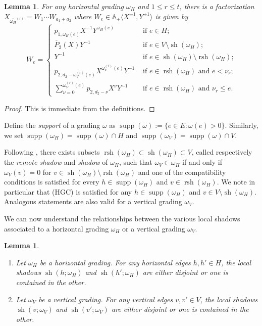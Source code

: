 \documentclass{amsart}
\newtheorem{lemma}[theorem]{Lemma}
\renewcommand{\AA}{\mathbb{A}}
\newcommand{\supp}{\operatorname{supp}}
\newcommand{\rsh}{\operatorname{rsh}}
\newcommand{\sh}{\operatorname{sh}}
\newenvironment{enumeratea}{\begin{enumerate}[\upshape (a)]}
                           {\end{enumerate}}
\begin{document}
\begin{lemma}
 For any horizontal grading $\omega_H$ and $1\le r\le t$, there is a factorization $X_{\overline{\omega_H}^{(r)}}=W_1\cdots W_{a_1+a_2}$ where $W_e\in\AA_+\langle X^{\pm1},Y^{\pm1}\rangle$ is given by
 \[W_e=\begin{cases}p_{1,\omega_H(e)}X^{-1}Y^{\omega_H(e)} & \text{ if $e\in H$;}\\ \overline{P}_2(X)Y^{-1} & \text{ if $e\in V\setminus\sh(\omega_H);$}\\ Y^{-1} & \text{ if $e\in\sh(\omega_H)\setminus\rsh(\omega_H)$;}\\ p_{2,d_2-\omega_V^{(r)}(e)}X^{\omega_V^{(r)}(e)}Y^{-1} & \text{ if $e\in\rsh(\omega_H)$ and $e<\nu_r$;}\\ \sum\limits_{\nu=0}^{\omega_V^{(r)}(e)}p_{2,d_2-\nu}X^\nu Y^{-1} & \text{ if $e\in\rsh(\omega_H)$ and $\nu_r\le e$.}\end{cases}\]
\end{lemma}
\begin{proof}
 This is immediate from the definitions.
\end{proof}


Define the \emph{support} of a grading $\omega$ as $\supp(\omega):=\{e\in E:\omega(e)>0\}$.  Similarly, we set $\supp(\omega_H)=\supp(\omega)\cap H$ and $\supp(\omega_V)=\supp(\omega)\cap V$. 

Following \cite[Lemma 4.4]{rupel2}, there exists subsets $\rsh(\omega_H)\subset\sh(\omega_H)\subset V$, called respectively the \emph{remote shadow} and \emph{shadow} of $\omega_H$, such that $\omega_V\in\overline{\omega_H}$ if and only if $\omega_V(v)=0$ for $v\in\sh(\omega_H)\setminus\rsh(\omega_H)$ and one of the compatibility conditions is satisfied for every $h\in\supp(\omega_H)$ and $v\in\rsh(\omega_H)$.  We note in particular that (HGC) is satisfied for any $h\in\supp(\omega_H)$ and $v\in V\setminus\sh(\omega_H)$.  Analogous statements are also valid for a vertical grading $\omega_V$.

















 

 We can now understand the relationships between the various local shadows associated to a horizontal grading $\omega_H$ or a vertical grading $\omega_V$.
 \begin{lemma}\label{le:shadow containment}\mbox{}
  \begin{enumeratea}
   \item Let $\omega_H$ be a horizontal grading.  For any horizontal edges $h,h'\in H$, the local shadows $\sh(h;\omega_H)$ and $\sh(h';\omega_H)$ are either disjoint or one is contained in the other.
   \item Let $\omega_V$ be a vertical grading.  For any vertical edges $v,v'\in V$, the local shadows $\sh(v;\omega_V)$ and $\sh(v';\omega_V)$ are either disjoint or one is contained in the other.
  \end{enumeratea}
 \end{lemma}
 
\end{document}

